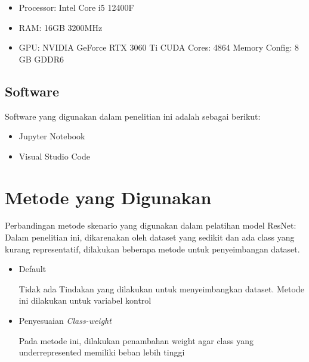 \begin{itemize}
	\item Processor: Intel Core i5 12400F
	\item RAM: 16GB 3200MHz
	\item GPU: NVIDIA GeForce RTX 3060 Ti
	\subitem CUDA Cores: 4864
	\subitem Memory Config: 8 GB GDDR6
\end{itemize}

\subsection{Software}
\label{sec:313}

Software yang digunakan dalam penelitian ini adalah sebagai berikut:
\begin{itemize}
	\item Jupyter Notebook
	\item Visual Studio Code
\end{itemize}

\section{Metode yang Digunakan}
\label{sec:32}

Perbandingan metode skenario yang digunakan dalam pelatihan model ResNet:
Dalam penelitian ini, dikarenakan oleh dataset yang sedikit dan ada class yang kurang representatif, dilakukan beberapa metode untuk penyeimbangan dataset.
\begin{itemize}
	\item Default
	
	Tidak ada Tindakan yang dilakukan untuk menyeimbangkan dataset. Metode ini dilakukan untuk variabel kontrol
	\item Penyesuaian \emph{Class-weight}
	
	Pada metode ini, dilakukan penambahan weight agar class yang underrepresented memiliki beban lebih tinggi
\end{itemize}

